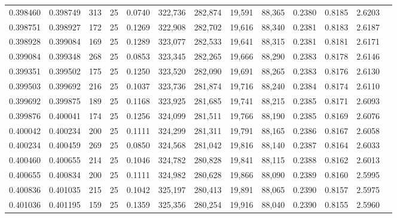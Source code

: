 \begin{tabular}{rrrrrrrrrrrrr}
0.398460 & 0.398749 &   313 &  25 &                                     0.0740 & 322,736 & 282,874 &  19,591 &  88,365 & 0.2380 & 0.8185 & 2.6203 \\
0.398751 & 0.398927 &   172 &  25 &                                     0.1269 & 322,908 & 282,702 &  19,616 &  88,340 & 0.2381 & 0.8183 & 2.6187 \\
0.398928 & 0.399084 &   169 &  25 &                                     0.1289 & 323,077 & 282,533 &  19,641 &  88,315 & 0.2381 & 0.8181 & 2.6171 \\
0.399084 & 0.399348 &   268 &  25 &                                     0.0853 & 323,345 & 282,265 &  19,666 &  88,290 & 0.2383 & 0.8178 & 2.6146 \\
0.399351 & 0.399502 &   175 &  25 &                                     0.1250 & 323,520 & 282,090 &  19,691 &  88,265 & 0.2383 & 0.8176 & 2.6130 \\
0.399503 & 0.399692 &   216 &  25 &                                     0.1037 & 323,736 & 281,874 &  19,716 &  88,240 & 0.2384 & 0.8174 & 2.6110 \\
0.399692 & 0.399875 &   189 &  25 &                                     0.1168 & 323,925 & 281,685 &  19,741 &  88,215 & 0.2385 & 0.8171 & 2.6093 \\
0.399876 & 0.400041 &   174 &  25 &                                     0.1256 & 324,099 & 281,511 &  19,766 &  88,190 & 0.2385 & 0.8169 & 2.6076 \\
0.400042 & 0.400234 &   200 &  25 &                                     0.1111 & 324,299 & 281,311 &  19,791 &  88,165 & 0.2386 & 0.8167 & 2.6058 \\
0.400234 & 0.400459 &   269 &  25 &                                     0.0850 & 324,568 & 281,042 &  19,816 &  88,140 & 0.2387 & 0.8164 & 2.6033 \\
0.400460 & 0.400655 &   214 &  25 &                                     0.1046 & 324,782 & 280,828 &  19,841 &  88,115 & 0.2388 & 0.8162 & 2.6013 \\
0.400655 & 0.400834 &   200 &  25 &                                     0.1111 & 324,982 & 280,628 &  19,866 &  88,090 & 0.2389 & 0.8160 & 2.5995 \\
0.400836 & 0.401035 &   215 &  25 &                                     0.1042 & 325,197 & 280,413 &  19,891 &  88,065 & 0.2390 & 0.8157 & 2.5975 \\
0.401036 & 0.401195 &   159 &  25 &                                     0.1359 & 325,356 & 280,254 &  19,916 &  88,040 & 0.2390 & 0.8155 & 2.5960 \\

\end{tabular}
